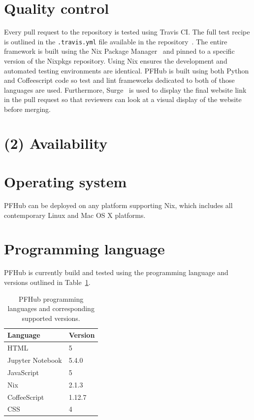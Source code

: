 \documentclass{jors}
\begin{document}
\section*{Quality control}

Every pull request to the repository is tested using Travis CI. The
full test recipe is outlined in the \texttt{.travis.yml} file
available in the repository~\cite{travisyml}. The entire framework is
built using the Nix Package Manager~\cite{nix} and pinned to a
specific version of the Nixpkgs repository. Using Nix ensures the
development and automated testing environments are identical. PFHub is
built using both Python and Coffeescript code so test and lint
frameworks dedicated to both of those languages are used. Furthermore,
Surge~\cite{surge} is used to display the final website link in the
pull request so that reviewers can look at a visual display of the
website before merging.

\section*{(2) Availability}
\vspace{0.5cm}
\section*{Operating system}

PFHub can be deployed on any platform supporting Nix, which includes
all contemporary Linux and Mac OS X platforms.

\section*{Programming language}

PFHub is currently build and tested using the programming language and
versions outlined in Table~\ref{tab:versions}.

\begin{table}[h!]
  \centering
  \begin{tabular}{|l|l|}
    \hline
    Language         & Version \\
    \hline
    HTML             & 5       \\
    Jupyter Notebook & 5.4.0   \\
    JavaScript       & 5       \\
    Nix              & 2.1.3   \\
    CoffeeScript     & 1.12.7  \\
    CSS              & 4       \\
    \hline
  \end{tabular}
  \caption{PFHub programming languages and corresponding supported
    versions.}
  \label{tab:versions}
\end{table}
\end{document}
